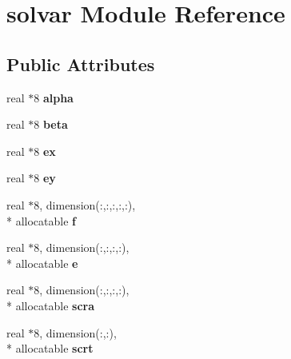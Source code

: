 \hypertarget{classsolvar}{\section{solvar Module Reference}
\label{classsolvar}
}
\subsection*{Public Attributes}
\begin{DoxyCompactItemize}
\item 
\hypertarget{classsolvar_a073d1315bc680fb39fc362ba6bf594ce}{real $\ast$8 {\bfseries alpha}}\label{classsolvar_a073d1315bc680fb39fc362ba6bf594ce}

\item 
\hypertarget{classsolvar_a5725a2a0747337e1d16960a3b85200a8}{real $\ast$8 {\bfseries beta}}\label{classsolvar_a5725a2a0747337e1d16960a3b85200a8}

\item 
\hypertarget{classsolvar_a06391e51201248c94eb6d340df3e1c09}{real $\ast$8 {\bfseries ex}}\label{classsolvar_a06391e51201248c94eb6d340df3e1c09}

\item 
\hypertarget{classsolvar_a6541ccef52d3c64c3307c1c7d641ded9}{real $\ast$8 {\bfseries ey}}\label{classsolvar_a6541ccef52d3c64c3307c1c7d641ded9}

\item 
\hypertarget{classsolvar_a65e316cbab45ed4383866a58bae753e4}{real $\ast$8, dimension(\-:,\-:,\-:,\-:,\-:), \\*
allocatable {\bfseries f}}\label{classsolvar_a65e316cbab45ed4383866a58bae753e4}

\item 
\hypertarget{classsolvar_abe73949647c2e368d832225599eead80}{real $\ast$8, dimension(\-:,\-:,\-:,\-:), \\*
allocatable {\bfseries e}}\label{classsolvar_abe73949647c2e368d832225599eead80}

\item 
\hypertarget{classsolvar_a0ba299df51d0061cf61eb0e3946501d1}{real $\ast$8, dimension(\-:,\-:,\-:,\-:), \\*
allocatable {\bfseries scra}}\label{classsolvar_a0ba299df51d0061cf61eb0e3946501d1}

\item 
\hypertarget{classsolvar_aa87e48bb8745643196367bffc83022fa}{real $\ast$8, dimension(\-:,\-:), \\*
allocatable {\bfseries scrt}}\label{classsolvar_aa87e48bb8745643196367bffc83022fa}


\end{DoxyCompactItemize}
